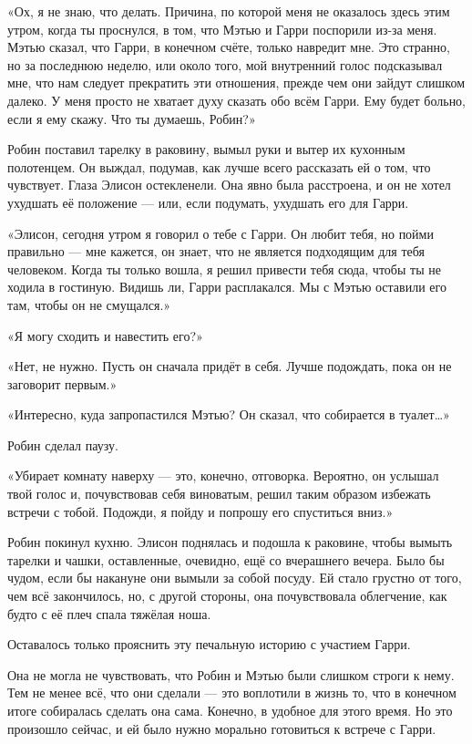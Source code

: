 \documentclass[a5paper, 9pt,
final, openany, twoside=true]{memoir}
\begin{document}
«Ох, я не знаю, что делать. Причина, по которой меня не оказалось здесь этим утром, когда ты проснулся, в том, что Мэтью и Гарри поспорили из-за меня. Мэтью сказал, что Гарри, в конечном счёте, только навредит мне. Это странно, но за последнюю неделю, или около того, мой внутренний голос подсказывал мне, что нам следует прекратить эти отношения, прежде чем они зайдут слишком далеко. У меня просто не хватает духу сказать обо всём Гарри. Ему будет больно, если я ему скажу. Что ты думаешь, Робин?»

Робин поставил тарелку в раковину, вымыл руки и вытер их кухонным полотенцем. Он выждал, подумав, как лучше всего рассказать ей о том, что чувствует. Глаза Элисон остекленели. Она явно была расстроена, и он не хотел ухудшать её положение — или, если подумать, ухудшать его для Гарри.

«Элисон, сегодня утром я говорил о тебе с Гарри. Он любит тебя, но пойми правильно — мне кажется, он знает, что не является подходящим для тебя человеком. Когда ты только вошла, я решил привести тебя сюда, чтобы ты не ходила в гостиную. Видишь ли, Гарри расплакался. Мы с Мэтью оставили его там, чтобы он не смущался.»

«Я могу сходить и навестить его?»

«Нет, не нужно. Пусть он сначала придёт в себя. Лучше подождать, пока он не заговорит первым.»

«Интересно, куда запропастился Мэтью? Он сказал, что собирается в туалет…»

Робин сделал паузу.

«Убирает комнату наверху — это, конечно, отговорка. Вероятно, он услышал твой голос и, почувствовав себя виноватым, решил таким образом избежать встречи с тобой. Подожди, я пойду и попрошу его спуститься вниз.»

Робин покинул кухню. Элисон поднялась и подошла к раковине, чтобы вымыть тарелки и чашки, оставленные, очевидно, ещё со вчерашнего вечера. Было бы чудом, если бы накануне они вымыли за собой посуду. Ей стало грустно от того, чем всё закончилось, но, с другой стороны, она почувствовала облегчение, как будто с её плеч спала тяжёлая ноша.

Оставалось только прояснить эту печальную историю с участием Гарри.

Она не могла не чувствовать, что Робин и Мэтью были слишком строги к нему. Тем не менее всё, что они сделали — это воплотили в жизнь то, что в конечном итоге собиралась сделать она сама. Конечно, в удобное для этого время. Но это произошло сейчас, и ей было нужно морально готовиться к встрече с Гарри.
\end{document}
